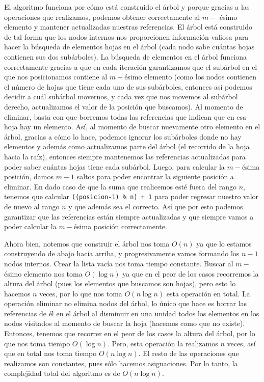 \documentclass[letterpaper,11pt]{article}
\begin{document}
\begin{enumerate}
\begin{enumerate}
        El algoritmo funciona por cómo está construido el árbol y porque gracias 
        a las operaciones que realizamos, podemos obtener correctamente al 
        $m-$ ésimo elemento y mantener actualizadas nuestras referencias. El 
        árbol está construido de tal forma que los nodos internos nos 
        proporcionen información valiosa para hacer la búsqueda de elementos 
        hojas en el árbol (cada nodo sabe cuántas hojas contienen sus dos 
        subárboles). La búsqueda de elementos en el árbol funciona correctamente 
        gracias a que en cada iteración garantizamos que el subárbol en el que 
        nos posicionamos contiene al $m-$ésimo elemento (como los nodos contienen 
        el número de hojas que tiene cada uno de sus subárboles, entonces así 
        podemos decidir a cuál subárbol movernos, y cada vez que nos movemos al 
        subárbol derecho, actualizamos el valor de la posición que buscamos). 
        Al momento de eliminar, basta con que borremos todas las referencias 
        que indican que en esa hoja hay un elemento. Así, al momento de buscar 
        nuevamente otro elemento en el árbol, gracias a cómo lo hace, podemos 
        ignorar los subárboles donde no hay elementos y además como actualizamos 
        parte del árbol (el recorrido de la hoja hacia la raíz), entonces siempre 
        mantenemos las referencias actualizadas para poder saber cuántas hojas 
        tiene cada subárbol. Luego, para calcular la $m-$ésima posición, damos 
        $m-1$ saltos para poder encontrar la siguiente posición a eliminar. En 
        dado caso de que la suma que realicemos esté fuera del rango $n$, 
        tenemos que calcular \texttt{((posicion-1) \% n) + 1} para poder 
        regresar nuestro valor de nuevo al rango $n$ y que además sea el 
        correcto. Así que por esto podemos garantizar que las referencias están 
        siempre actualizadas y que siempre vamos a poder calcular la $m-$ésima 
        posición correctamente.

        Ahora bien, notemos que construir el árbol nos toma $O(n)$ ya que lo 
        estamos construyendo de abajo hacia arriba, y progresivamente vamos 
        formando los $n-1$ nodos internos. Crear la lista vacía nos toma tiempo 
        constante. Buscar al $m-$ésimo elemento nos toma $O(\log n)$ ya que en 
        el peor de los casos recorremos la altura del árbol (pues los elementos 
        que buscamos son hojas), pero esto lo hacemos $n$ veces, por lo que nos 
        toma $O(n \log n)$ esta operación en total. La operación eliminar no 
        elimina nodos del árbol, lo único que hace es borrar las referencias 
        de él en el árbol al disminuir en una unidad todos los elementos en los 
        nodos visitados al momento de buscar la hoja (hacemos como que no 
        existe). Entonces, tenemos que recorrer en el peor de los casos la 
        altura del árbol, por lo que nos toma tiempo $O(\log n)$. Pero, esta 
        operación la realizamos $n$ veces, así que en total nos toma tiempo 
        $O(n \log n)$. El resto de las operaciones que realizamos son constantes, 
        pues sólo hacemos asignaciones. Por lo tanto, la complejidad total del 
        algoritmo es de $O(n \log n)$.


\end{enumerate}
\end{enumerate}
\end{document}
